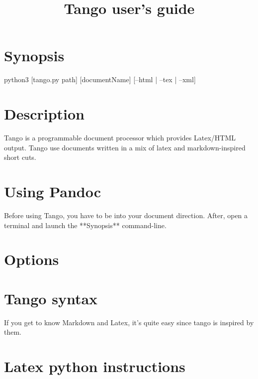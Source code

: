 \title{Tango user's guide}

\part{Synopsis}

python3 [tango.py path] [documentName] [--html | --tex | --xml]

\part{Description}

Tango is a programmable document processor which provides Latex/HTML output.
Tango use documents written in a mix of latex and markdown-inspired short cuts.

\part{Using Pandoc}

Before using Tango, you have to be into your document direction.
After, open a terminal and launch the **Synopsis** command-line.

\part{Options}



\part{Tango syntax}

If you get to know Markdown and Latex, it's quite easy since tango is inspired by them.



%

\part{Latex python instructions}


